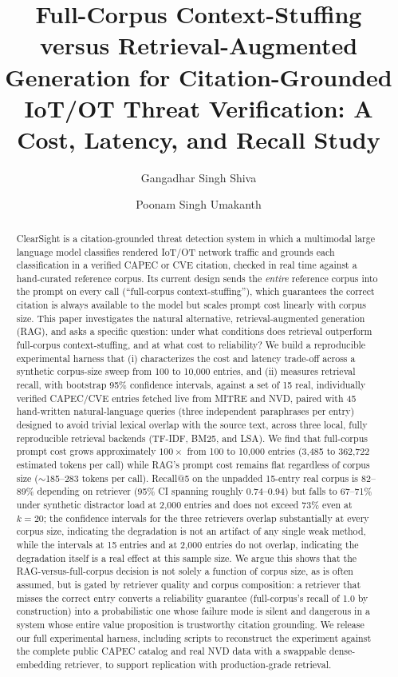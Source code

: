 \documentclass[11pt]{article}
\title{\textbf{Full-Corpus Context-Stuffing versus Retrieval-Augmented Generation for Citation-Grounded IoT/OT Threat Verification: A Cost, Latency, and Recall Study}}
\author{Gangadhar Singh Shiva \and Poonam Singh Umakanth}
\date{}
\begin{document}
\maketitle

\begin{abstract}
ClearSight is a citation-grounded threat detection system in which a multimodal large language model classifies rendered IoT/OT network traffic and grounds each classification in a verified CAPEC or CVE citation, checked in real time against a hand-curated reference corpus. Its current design sends the \emph{entire} reference corpus into the prompt on every call (``full-corpus context-stuffing''), which guarantees the correct citation is always available to the model but scales prompt cost linearly with corpus size. This paper investigates the natural alternative, retrieval-augmented generation (RAG), and asks a specific question: under what conditions does retrieval outperform full-corpus context-stuffing, and at what cost to reliability? We build a reproducible experimental harness that (i) characterizes the cost and latency trade-off across a synthetic corpus-size sweep from 100 to 10{,}000 entries, and (ii) measures retrieval recall, with bootstrap 95\% confidence intervals, against a set of 15 real, individually verified CAPEC/CVE entries fetched live from MITRE and NVD, paired with 45 hand-written natural-language queries (three independent paraphrases per entry) designed to avoid trivial lexical overlap with the source text, across three local, fully reproducible retrieval backends (TF-IDF, BM25, and LSA). We find that full-corpus prompt cost grows approximately $100\times$ from 100 to 10{,}000 entries (3{,}485 to 362{,}722 estimated tokens per call) while RAG's prompt cost remains flat regardless of corpus size ($\sim$185--283 tokens per call). Recall@5 on the unpadded 15-entry real corpus is 82--89\% depending on retriever (95\% CI spanning roughly 0.74--0.94) but falls to 67--71\% under synthetic distractor load at 2{,}000 entries and does not exceed 73\% even at $k=20$; the confidence intervals for the three retrievers overlap substantially at every corpus size, indicating the degradation is not an artifact of any single weak method, while the intervals at 15 entries and at 2{,}000 entries do not overlap, indicating the degradation itself is a real effect at this sample size. We argue this shows that the RAG-versus-full-corpus decision is not solely a function of corpus size, as is often assumed, but is gated by retriever quality and corpus composition: a retriever that misses the correct entry converts a reliability guarantee (full-corpus's recall of 1.0 by construction) into a probabilistic one whose failure mode is silent and dangerous in a system whose entire value proposition is trustworthy citation grounding. We release our full experimental harness, including scripts to reconstruct the experiment against the complete public CAPEC catalog and real NVD data with a swappable dense-embedding retriever, to support replication with production-grade retrieval.
\end{abstract}
\end{document}
